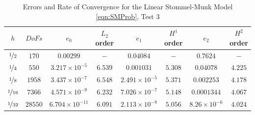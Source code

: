 \begin{table}%
\begin{center}
\begin{tabular}{|c|c|c|c|c|c|c|c|}%
  \hline
  $h$ & $DoFs$ & $e_0$ & $L_2$ order & $e_1$ & $H^1$ order & $e_2$ & $H^2$ order \\[0.2em] %
  \hline
  $\nicefrac{1}{2}$ & $170$ & $0.00299$ & $-$ & $0.04084$ & $-$ & $0.7624$ & $-$ \\[0.2em] %
  $\nicefrac{1}{4}$ & $550$ & $3.217\times 10^{-5}$ & $6.539$ & $0.001031$ & $5.308$ & $0.04078$ & $4.225$ \\[0.2em] %
  $\nicefrac{1}{8}$ & $1958$ & $3.437\times 10^{-7}$ & $6.548$ & $2.491\times 10^{-5}$ & $5.371$ & $0.002253$ & $4.178$ \\[0.2em] %
  $\nicefrac{1}{16}$ & $7366$ & $4.571\times 10^{-9}$ & $6.232$ & $7.026\times 10^{-7}$ & $5.148$ & $0.0001344$ & $4.067$ \\[0.2em] %
  $\nicefrac{1}{32}$ & $28550$ & $6.704\times 10^{-11}$ & $6.091$ & $2.113\times 10^{-8}$ & $5.056$ & $8.26\times 10^{-6}$ & $4.024$ \\[0.2em] %
 \hline
\end{tabular}
\end{center}
\caption{Errors and Rate of Convergence for the Linear Stommel-Munk Model \eqref{eqn:SMProb}, Test 3 \cite{Cascon}}
\label{tab:SMsinErrors}
\end{table}

